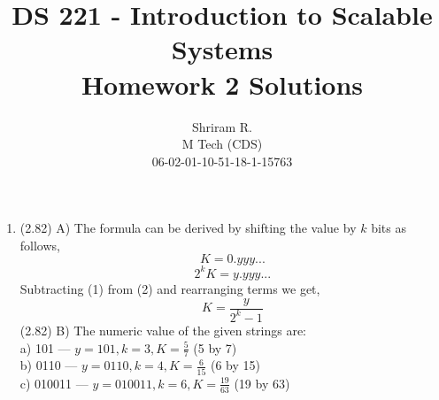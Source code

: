 \documentclass[11pt,a4paper,oneside]{article}
\newcommand \tab[1][1cm]{\hspace*{#1}}
\begin{document}
	\title{DS 221 - Introduction to Scalable Systems \\ Homework 2 Solutions}
	\author{Shriram R. \\ M Tech (CDS) \\ 06-02-01-10-51-18-1-15763}
	\maketitle
	\begin{enumerate}{}{}
		\item (2.82) A) The formula can be derived by shifting the value by $k$ bits as follows, \\
		      \begin{equation}
		      K = 0.yyy...
		      \end{equation}
		      \begin{equation}
	          2^k K = y.yyy...
	          \end{equation}
	          \tab Subtracting (1) from (2) and rearranging terms we get, \\
	          \begin{equation}
	          K = \frac{y}{2^k-1}
	          \end{equation}
	          \newline
	         (2.82) B) The numeric value of the given strings are: \\
	         \tab a) 101 --- $ y = 101, k=3, K = \frac{5}{7}$ (5 by 7) \\
	         \tab b) 0110 --- $y = 0110, k = 4, K = \frac{6}{15}$ (6 by 15)\\
	         \tab c) 010011 --- $y = 010011, k = 6, K = \frac{19}{63}$ (19 by 63)\\           
		\begin{multicols}{2}
		\item (2.89) The C program is given below,
		\begin{verbatim}
	    float fpwr2(int x)
	    {
	      unsigned exp, frac;
	      unsigned u;
	      

\end{verbatim}
\end{multicols}
\end{enumerate}
\end{document}

